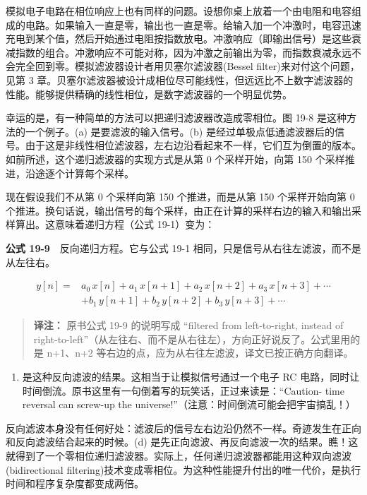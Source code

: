 模拟电子电路在相位响应上也有同样的问题。设想你桌上放着一个由电阻和电容组成的电路。如果输入一直是零，输出也一直是零。给输入加一个冲激时，电容迅速充电到某个值，然后开始通过电阻按指数放电。冲激响应（即输出信号）是这些衰减指数的组合。冲激响应不可能对称，因为冲激之前输出为零，而指数衰减永远不会完全回到零。模拟滤波器设计者用贝塞尔滤波器(Bessel
filter)来对付这个问题，见第 3
章。贝塞尔滤波器被设计成相位尽可能线性，但远远比不上数字滤波器的性能。能够提供精确的线性相位，是数字滤波器的一个明显优势。

幸运的是，有一种简单的方法可以把递归滤波器改造成零相位。图 19-8
是这种方法的一个例子。(a) 是要滤波的输入信号。(b)
是经过单极点低通滤波器后的信号。由于这是非线性相位滤波器，左右边沿看起来不一样，它们互为倒置的版本。如前所述，这个递归滤波器的实现方式是从第
0 个采样开始，向第 150 个采样推进，沿途逐个计算每个采样。

现在假设我们不从第 0 个采样向第 150 个推进，而是从第 150 个采样开始向第
0
个推进。换句话说，输出信号的每个采样，由正在计算的采样右边的输入和输出采样算出。这意味着递归方程（公式
19-1）变为：

\textbf{公式 19-9}　反向递归方程。它与公式 19-1
相同，只是信号从右往左滤波，而不是从左往右。

\[\begin{aligned} y[n] = {}& a_0\,x[n] + a_1\,x[n+1] + a_2\,x[n+2] + a_3\,x[n+3] + \cdots \\ & + b_1\,y[n+1] + b_2\,y[n+2] + b_3\,y[n+3] + \cdots \end{aligned}\]

\begin{quote}
\textbf{译注：} 原书公式 19-9 的说明写成 ``filtered from left-to-right,
instead of
right-to-left''（从左往右、而不是从右往左），方向正好说反了。公式里用的是
n+1、n+2 等右边的点，应为从右往左滤波，译文已按正确方向翻译。
\end{quote}

\begin{enumerate}
\def\labelenumi{(\alph{enumi})}
\setcounter{enumi}{2}
\tightlist
\item
  是这种反向滤波的结果。这相当于让模拟信号通过一个电子 RC
  电路，同时让时间倒流。原书这里有一句倒着写的玩笑话，正过来读是：``Caution-
  time reversal can screw-up the
  universe!''（注意：时间倒流可能会把宇宙搞乱！）
\end{enumerate}

反向滤波本身没有任何好处：滤波后的信号左右边沿仍然不一样。奇迹发生在正向和反向滤波结合起来的时候。(d)
是先正向滤波、再反向滤波一次的结果。瞧！这就得到了一个零相位递归滤波器。实际上，任何递归滤波器都能用这种双向滤波(bidirectional
filtering)技术变成零相位。为这种性能提升付出的唯一代价，是执行时间和程序复杂度都变成两倍。

